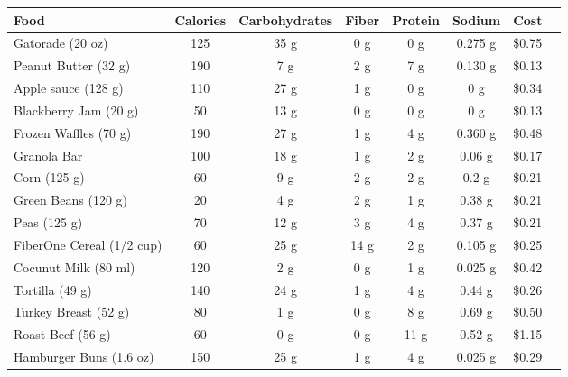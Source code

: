 \documentclass[11pt, oneside]{article}
\begin{document}
    \begin{center}
        \begin{tabular}{lccccccc}
            \toprule
            Food                 & Calories & Carbohydrates & Fiber & Protein &  Sodium &   Cost \\
            \midrule
            Gatorade (20 oz)     &      125 &          35 g &   0 g &     0 g & 0.275 g & \$0.75 \\ %
            Peanut Butter (32 g) &      190 &           7 g &   2 g &     7 g & 0.130 g & \$0.13 \\ %
            Apple sauce (128 g)  &      110 &          27 g &   1 g &     0 g &     0 g & \$0.34 \\ %
            Blackberry Jam (20 g)&       50 &          13 g &   0 g &     0 g &     0 g & \$0.13 \\ %
            Frozen Waffles (70 g)&      190 &          27 g &   1 g &     4 g & 0.360 g & \$0.48 \\ %
            Granola Bar          &      100 &          18 g &   1 g &     2 g &  0.06 g & \$0.17 \\ %
            Corn (125 g)         &       60 &           9 g &   2 g &     2 g &   0.2 g & \$0.21 \\ %
            Green Beans (120 g)  &       20 &           4 g &   2 g &     1 g &  0.38 g & \$0.21 \\ %
            Peas (125 g)         &       70 &          12 g &   3 g &     4 g &  0.37 g & \$0.21 \\ %
            FiberOne Cereal (1/2 cup)&   60 &          25 g &  14 g &     2 g & 0.105 g & \$0.25 \\ %
            Cocunut Milk (80 ml) &      120 &           2 g &   0 g &     1 g & 0.025 g & \$0.42 \\ %
            Tortilla (49 g)      &      140 &          24 g &   1 g &     4 g &  0.44 g & \$0.26 \\ %
            Turkey Breast (52 g) &       80 &           1 g &   0 g &     8 g &  0.69 g & \$0.50 \\ %
            Roast Beef (56 g)    &       60 &           0 g &   0 g &    11 g &  0.52 g & \$1.15 \\ %
            Hamburger Buns (1.6 oz)&    150 &          25 g &   1 g &     4 g & 0.025 g & \$0.29 \\ %
            \bottomrule
        \end{tabular}
    \end{center}
\end{document}
